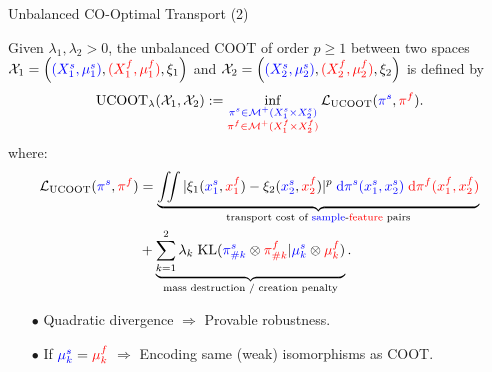 \documentclass{beamer}
\newcommand{\ucoot}{\text{UCOOT}}
\newcommand{\cX}{\mathcal X}
\newcommand{\cM}{\mathcal M}
\newcommand{\cL}{\mathcal L}
\newcommand{\pis}{{\color{blue}{\pi^s}}}
\newcommand{\pif}{{\color{red}{\pi^f}}}
\newcommand{\sfspace}{{\color{blue}{s.}}{\color{red}{f. }}}
\begin{document}
\begin{frame}{Unbalanced CO-Optimal Transport (2)}
\scriptsize
\vspace{-0.8cm}
\begin{definition}[UCOOT]
  Given $\lambda_1, \lambda_2 >0$, the unbalanced COOT of order $p \geq 1$
  between two \sfspace spaces $\cX_1 = \left({\color{blue}{(X_1^s, \mu_1^s)}}, {\color{red}{(X_1^f, \mu_1^f)}}, \xi_1 \right)$
  and $\cX_2 = \left({\color{blue}{(X_2^s, \mu_2^s)}}, {\color{red}{(X_2^f, \mu_2^f)}}, \xi_2 \right)$ is defined by
  \begin{align*}
\label{eq:ucoot}
    \ucoot_{\lambda}(\cX_1, \cX_2) :=
  \inf_{\substack{{\color{blue}{\pi^s \in \cM^+(X_1^s \times X_2^s)}}
  \\ {\color{red}{\pi^f \in \cM^+(X_1^f \times X_2^f)}}}}
  \cL_{\ucoot}(\pis, \pif).
\end{align*}
\vspace{-0.8cm}
where:
\begin{align*}
    \cL_{\ucoot}(\pis, \pif) &= \underbrace{\iint
    |\xi_1({\color{blue}{x_1^s}}, {\color{red}{x_1^f}}) - \xi_2({\color{blue}{x_2^s}}, {\color{red}{x_2^f}})|^p \; {\color{blue}{\mathrm d\pi^s(x_1^s, x_2^s)}} \;
    {\color{red}{\mathrm d \pi^f(x_1^f, x_2^f)}}}_{\text{transport cost of {\color{blue}{sample}}-{\color{red}{feature}} pairs}} \\
    &+ \underbrace{\sum_{k=1}^2\lambda_k \; \text{KL}({\color{blue}{\pi^s_{\# k}}} \otimes {\color{red}{\pi^f_{\# k}}} \vert {\color{blue}{\mu^s_k}} \otimes {\color{red}{\mu^f_k}})}_{\text{mass destruction / creation penalty}}.
\end{align*}
\end{definition}

\begin{itemize}
  \item[$\bullet$] Quadratic divergence $\Rightarrow$ Provable robustness.
  \item[$\bullet$] If ${\color{blue}{\mu^s_k}} = {\color{red}{\mu^f_k}}$ $\Rightarrow$
  Encoding same (weak) isomorphisms as COOT.
\end{itemize}



\end{frame}
\end{document}
